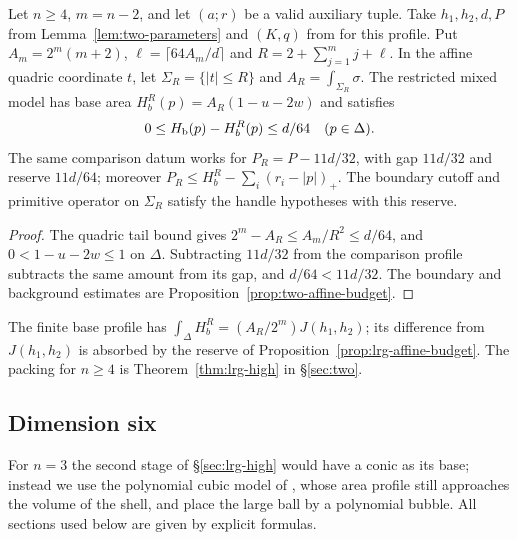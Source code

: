 \begin{proposition}\label{prop:lrg-affine-budget}
Let $n\ge4$, $m=n-2$, and let $(a;r)$ be a valid auxiliary tuple. Take $h_1,h_2,d,P$ from
Lemma~\ref{lem:two-parameters} and $(K,q)$ from  for this profile.
Put $A_m=2^m(m+2)$, $\ell=\lceil64A_m/d\rceil$ and
$R=2+\sum_{j=1}^m j+\ell$. In the affine quadric coordinate $t$, let $\Sigma_R=\{|t|\le R\}$ and
$A_R=\int_{\Sigma_R}\sigma$. The restricted mixed model has base area
$H_b^R(p)=A_R(1-u-2w)$ and satisfies
\[
 0\le H_{\mathrm b}(p)-H_b^R(p)\le d/64\quad(p\in\Delta).
\]
The same comparison datum works for $P_R=P-11d/32$, with gap $11d/32$ and reserve $11d/64$;
moreover $P_R\le H_b^R-\sum_i(r_i-|p|)_+$. The boundary cutoff and primitive operator on $\Sigma_R$
satisfy the handle hypotheses with this reserve.
\end{proposition}

\begin{proof}
The quadric tail bound gives $2^m-A_R\le A_m/R^2\le d/64$, and $0<1-u-2w\le1$ on $\Delta$.
Subtracting $11d/32$ from the comparison profile subtracts the same amount from its gap, and
$d/64<11d/32$. The boundary and background estimates are Proposition~\ref{prop:two-affine-budget}.
\end{proof}

The finite base profile has $\int_\Delta H_b^R=(A_R/2^m)J(h_1,h_2)$; its difference from $J(h_1,h_2)$ is absorbed by
the reserve of Proposition~\ref{prop:lrg-affine-budget}. The packing for $n\ge4$ is Theorem~\ref{thm:lrg-high} in
\S\ref{sec:two}.

\subsection{Dimension six}\label{sec:lrg-six}

For $n=3$ the second stage of \S\ref{sec:lrg-high} would have a conic as its base; instead we use the polynomial
cubic model of \cite{OpenAI2026}, whose area profile still approaches the volume of the shell, and place the
large ball by a polynomial bubble. All sections used below are given by explicit formulas.


